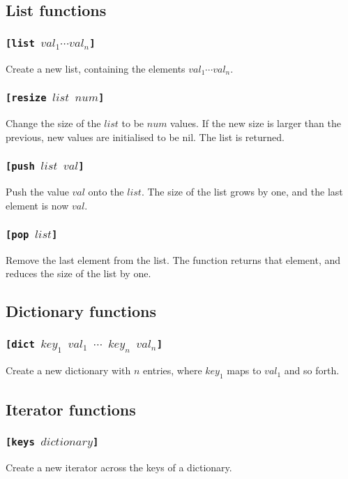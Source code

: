 \subsection{List functions}
\subsubsection{\tt{[list }$val_1\cdots val_n$\tt{]}}
Create a new list, containing the elements $val_1\cdots val_n$.

\subsubsection{\tt{[resize }$list$ $num$\tt{]}}
Change the size of the $list$ to be $num$ values. If the new size is larger than the previous, new values are initialised to be nil. The list is returned.

\subsubsection{\tt{[push }$list$ $val$\tt{]}}
Push the value $val$ onto the $list$. The size of the list grows by one, and the last element is now $val$.

\subsubsection{\tt{[pop }$list$\tt{]}}
Remove the last element from the list. The function returns that element, and reduces the size of the list by one.

\subsection{Dictionary functions}
\subsubsection{\tt{[dict }$key_1$  $val_1$ $\cdots$ $key_n$ $val_n$\tt{]}}
Create a new dictionary with $n$ entries, where $key_1$ maps to $val_1$ and so forth.

\subsection{Iterator functions}
\subsubsection{\tt{[keys }$dictionary$\tt{]}}
Create a new iterator across the keys of a dictionary.
